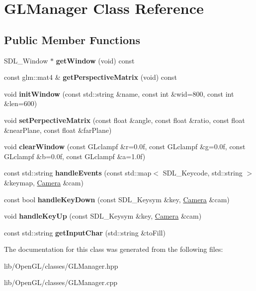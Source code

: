 \hypertarget{class_g_l_manager}{}\section{G\+L\+Manager Class Reference}
\label{class_g_l_manager}
\subsection*{Public Member Functions}
\begin{DoxyCompactItemize}
\item 
\mbox{\label{class_g_l_manager_ad87bda8387bc538bc0c4340501040483}} 
S\+D\+L\+\_\+\+Window $\ast$ {\bfseries get\+Window} (void) const
\item 
\mbox{\label{class_g_l_manager_abbf99309cf92c7824637604c449f60ca}} 
const glm\+::mat4 \& {\bfseries get\+Perspective\+Matrix} (void) const
\item 
\mbox{\label{class_g_l_manager_abd3642ffde790a4bd20c182144ac3ef4}} 
void {\bfseries init\+Window} (const std\+::string \&name, const int \&wid=800, const int \&len=600)
\item 
\mbox{\label{class_g_l_manager_a5d7b1d2c08f4f16d75f968b629f1d3b5}} 
void {\bfseries set\+Perpective\+Matrix} (const float \&angle, const float \&ratio, const float \&near\+Plane, const float \&far\+Plane)
\item 
\mbox{\label{class_g_l_manager_a1a3fd00de3c709ab4b81b1a734f971f2}} 
void {\bfseries clear\+Window} (const G\+Lclampf \&r=0.\+0f, const G\+Lclampf \&g=0.\+0f, const G\+Lclampf \&b=0.\+0f, const G\+Lclampf \&a=1.\+0f)
\item 
\mbox{\label{class_g_l_manager_a290e1f4ce2656c82f9eadaf800c4598b}} 
const std\+::string {\bfseries handle\+Events} (const std\+::map$<$ S\+D\+L\+\_\+\+Keycode, std\+::string $>$ \&keymap, \hyperlink{class_camera}{Camera} \&cam)
\item 
\mbox{\label{class_g_l_manager_af495168157244aa4f79a5cb96625b077}} 
const bool {\bfseries handle\+Key\+Down} (const S\+D\+L\+\_\+\+Keysym \&key, \hyperlink{class_camera}{Camera} \&cam)
\item 
\mbox{\label{class_g_l_manager_a57d63191667702ad02e057f48f10147d}} 
void {\bfseries handle\+Key\+Up} (const S\+D\+L\+\_\+\+Keysym \&key, \hyperlink{class_camera}{Camera} \&cam)
\item 
\mbox{\label{class_g_l_manager_a342c998f2325bbdd693c817e76b3dced}} 
const std\+::string {\bfseries get\+Input\+Char} (std\+::string \&to\+Fill)
\end{DoxyCompactItemize}


The documentation for this class was generated from the following files\+:\begin{DoxyCompactItemize}
\item 
lib/\+Open\+G\+L/classes/G\+L\+Manager.\+hpp\item 
lib/\+Open\+G\+L/classes/G\+L\+Manager.\+cpp\end{DoxyCompactItemize}
